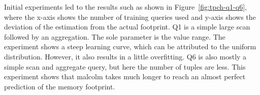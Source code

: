 \documentclass[conference]{IEEEtran}
\begin{document}
Initial experiments led to the results such as shown in Figure~\ref{fig:tpch-q1-q6}, where the x-axis shows the number of training queries used and y-axis shows the deviation of the estimation from the actual footprint.
Q1 is a simple large scan followed by an aggregation. The sole parameter is the value range.
The experiment shows a steep learning curve, which can be attributed to the uniform distribution.
However, it also results in a little overfitting.
Q6 is also mostly a simple scan and aggregate query, but here the number of tuples are less.
This experiment shows that {\sc malcolm} takes much longer to reach an almost perfect prediction of the memory footprint.


\end{document}
